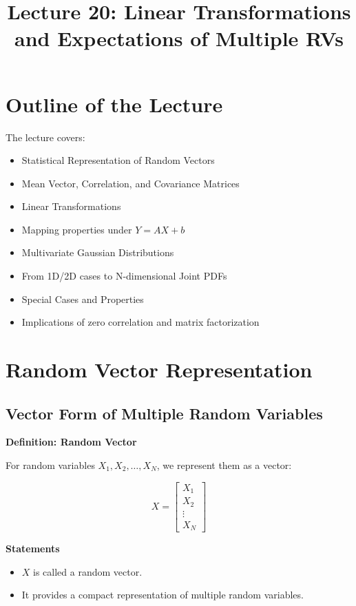 \documentclass[12pt]{article}
\title{Lecture 20: Linear Transformations and Expectations of Multiple RVs}
\date{}
\begin{document}
\maketitle

\section{Outline of the Lecture}

The lecture covers:
\begin{itemize}
\item Statistical Representation of Random Vectors
\item Mean Vector, Correlation, and Covariance Matrices
\item Linear Transformations
\item Mapping properties under $Y = AX + b$
\item Multivariate Gaussian Distributions
\item From 1D/2D cases to N-dimensional Joint PDFs
\item Special Cases and Properties
\item Implications of zero correlation and matrix factorization
\end{itemize}

\section{Random Vector Representation}

\subsection{Vector Form of Multiple Random Variables}

\textbf{Definition: Random Vector}

For random variables $X_1, X_2, \ldots, X_N$, we represent them as a vector:

\[
X =
\begin{bmatrix}
X_1 \\
X_2 \\
\vdots \\
X_N
\end{bmatrix}
\]

\textbf{Statements}
\begin{itemize}
\item $X$ is called a random vector.
\item It provides a compact representation of multiple random variables.
\end{itemize}
\end{document}
